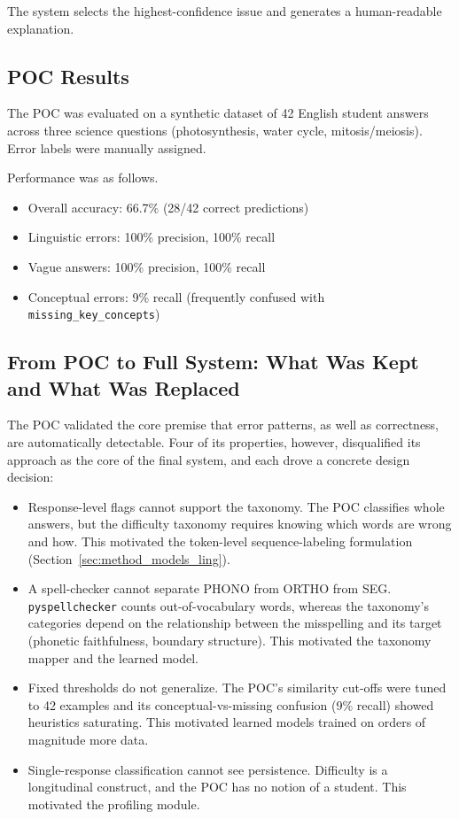 The system selects the highest-confidence issue and generates a human-readable explanation.

\subsection{POC Results}
\label{sec:method_poc_results}

The POC was evaluated on a synthetic dataset of 42 English student answers across three science questions (photosynthesis, water cycle, mitosis/meiosis). Error labels were manually assigned.

Performance was as follows.
\begin{itemize}
    \item Overall accuracy: 66.7\% (28/42 correct predictions)
    \item Linguistic errors: 100\% precision, 100\% recall
    \item Vague answers: 100\% precision, 100\% recall
    \item Conceptual errors: 9\% recall (frequently confused with \texttt{missing\_key\_concepts})
\end{itemize}

\subsection{From POC to Full System: What Was Kept and What Was Replaced}
\label{sec:method_poc_future}

The POC validated the core premise that error patterns, as well as correctness, are automatically detectable. Four of its properties, however, disqualified its approach as the core of the final system, and each drove a concrete design decision:

\begin{itemize}
    \item Response-level flags cannot support the taxonomy. The POC classifies whole answers, but the difficulty taxonomy requires knowing which words are wrong and how. This motivated the token-level sequence-labeling formulation (Section~\ref{sec:method_models_ling}).
    \item A spell-checker cannot separate PHONO from ORTHO from SEG. \texttt{pyspellchecker} counts out-of-vocabulary words, whereas the taxonomy's categories depend on the relationship between the misspelling and its target (phonetic faithfulness, boundary structure). This motivated the taxonomy mapper and the learned model.
    \item Fixed thresholds do not generalize. The POC's similarity cut-offs were tuned to 42 examples and its conceptual-vs-missing confusion (9\% recall) showed heuristics saturating. This motivated learned models trained on orders of magnitude more data.
    \item Single-response classification cannot see persistence. Difficulty is a longitudinal construct, and the POC has no notion of a student. This motivated the profiling module.
\end{itemize}

